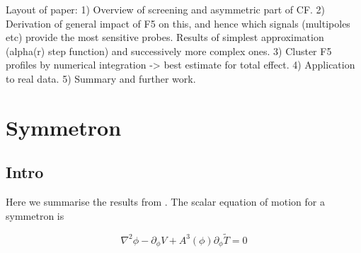 \documentclass[aps,showpacs,onecolumn,floats,prd,superscriptaddress,nofootinbib]{revtex4-1}
\begin{document}
Layout of paper: 1) Overview of screening and asymmetric part of CF. 2) Derivation of general impact of F5 on this, and hence which signals (multipoles etc) provide the most sensitive probes. Results of simplest approximation (alpha(r) step function) and successively more complex ones. 3) Cluster F5 profiles by numerical integration -> best estimate for total effect. 4) Application to real data. 5) Summary and further work.


% 
% 
% 
% 
% 
% 
% 
% 
% 

\section{Symmetron}
\subsection{Intro}
Here we summarise the results from \cite{Hinterbichler:2010es,Clampitt:2011mx}.
The scalar equation of motion for a symmetron is 

\begin{equation}
	\nabla^2 \phi -\partial_\phi V + A^3(\phi)\partial_\phi \tilde{T} = 0
\end{equation}
\end{document}
